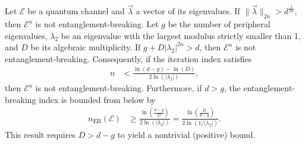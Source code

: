 \begin{prop}
Let $\mathcal{E}$ be a quantum channel and $\vec{\lambda}$ a vector of its eigenvalues. If $
    \|\vec{\lambda}\|_{2n} > d^{\frac{1}{2n}}$, 
then $\mathcal{E}^n$ is not entanglement-breaking. Let $g$ be the number of peripheral eigenvalues, $\lambda_2$ be an eigenvalue with the largest modulus strictly smaller than 1, and $D$ be its algebraic multiplicity. If $
    g + D|\lambda_2|^{2n} > d$, 
then $\mathcal{E}^n$ is not entanglement-breaking. Consequently, if the iteration index satisfies
\begin{align*}
    n &< \frac{\ln(d - g) - \ln(D)}{2\ln(|\lambda_2|)},
\end{align*}
then $\mathcal{E}^n$ is not entanglement-breaking. Furthermore, if $d > g$, the entanglement-breaking index is bounded from below by
\begin{align*}
    n_{\text{EB}}(\mathcal{E}) &\ge \frac{\ln\left(\frac{d-g}{D}\right)}{2\ln(|\lambda_2|)} = \frac{\ln\left(\frac{D}{d-g}\right)}{2\ln(1/|\lambda_2|)}.
\end{align*}
This result requires $D > d - g$ to yield a nontrivial (positive) bound.
\end{prop}


